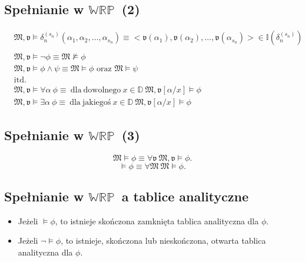 \documentclass[12pt]{article}
\newcommand {\WRP} {\ensuremath{\mathbb{WRP}}}
\begin{document}
\subsection{Spełnianie w \WRP~(2)}
%
\begin{eqnarray}
\label{sat-2}
& \mathfrak{M},\mathfrak{v} \vDash \delta_n^{(s_{n})}(\alpha_{1}, \alpha_{2}, \dots, \alpha_{s_{n}}) \equiv <\mathfrak{v}(\alpha_{1}), \mathfrak{v}(\alpha_{2}), \dots, \mathfrak{v}(\alpha_{s_{n}})> \in \mathbb{I}(\delta_n^{(s_{n})})\nonumber \\ \\
%
& \mathfrak{M},\mathfrak{v} \vDash \neg \phi \equiv \mathfrak{M} \nvDash \phi \\
%
& \mathfrak{M},\mathfrak{v} \vDash \phi \land \psi \equiv \mathfrak{M} \vDash \phi \textrm{~oraz~}  \mathfrak{M} \vDash \psi\\
%
& \mathrm{itd.}\nonumber \\
%
& \mathfrak{M},\mathfrak{v} \vDash \forall \alpha ~ \phi \equiv \mathrm{~dla~ dowolnego~} x \in \mathbb{D}~\mathfrak{M},\mathfrak{v}[\alpha/x] \vDash \phi\\
%
& \mathfrak{M},\mathfrak{v} \vDash \exists \alpha ~ \phi \equiv \mathrm{~dla~ jakiegoś~} x \in \mathbb{D}~\mathfrak{M},\mathfrak{v}[\alpha/x] \vDash \phi
\end{eqnarray}
%

\subsection{Spełnianie w \WRP~(3)}
%
\begin{equation}
\mathfrak{M} \vDash \phi \equiv \forall \mathfrak{v}~\mathfrak{M},\mathfrak{v} \vDash \phi.
\end{equation}
%
\begin{equation}
\vDash \phi \equiv \forall \mathfrak{M}~ \mathfrak{M}\vDash \phi.
\end{equation}
%

\subsection{Spełnianie w \WRP~a tablice analityczne}
%
\begin{itemize}
    \item Jeżeli $\vDash \phi$, to istnieje skończona zamknięta tablica analityczna dla $\phi$.%
    \item Jeżeli $\neg \vDash \phi$, to istnieje, skończona lub nieskończona, otwarta tablica analityczna dla $\phi$.
\end{itemize}
%
\end{document}
